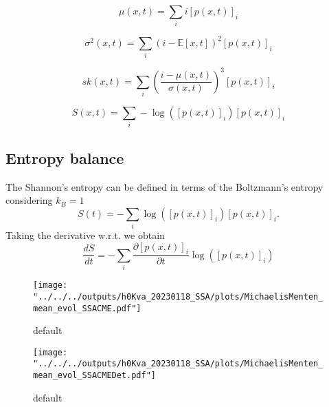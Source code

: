 \documentclass[conference]{IEEEtran}
\begin{document}
\begin{equation}
\mu(x,t) = \sum_i i [p(x,t)]_i
\end{equation}

\begin{equation}
\sigma^2(x,t) = \sum_i (i - \mathbb{E}[x,t])^2 [p(x,t)]_i
\end{equation}

\begin{equation}
sk(x,t) = \sum_i \left(\frac{i - \mu(x,t)}{\sigma(x,t)}\right)^3 [p(x,t)]_i
\end{equation}

\begin{equation}
S(x,t) = \sum_i -\log([p(x,t)]_i) [p(x,t)]_i
\end{equation}

\subsection{Entropy balance}
The Shannon's entropy can be defined in terms of the Boltzmann's entropy considering $k_B = 1$
%
\begin{equation}
S(t) = - \sum_i \log([p(x,t)]_i)[p(x,t)]_i.
\end{equation}
%
Taking the derivative w.r.t. we obtain
%
\begin{equation}
\frac{dS}{dt} = - \sum_i \frac{\partial [p(x,t)]_i}{\partial t} \log([p(x,t)]_i)
\end{equation}


\begin{figure}[htbp]
\begin{center}
\texttt{[image: "../../../outputs/h0Kva\_20230118\_SSA/plots/MichaelisMenten\_mean\_evol\_SSACME.pdf"]}
\caption{default}
\label{default}
\end{center}
\end{figure}
\begin{figure}[htbp]
\begin{center}
\texttt{[image: "../../../outputs/h0Kva\_20230118\_SSA/plots/MichaelisMenten\_mean\_evol\_SSACMEDet.pdf"]}
\caption{default}
\label{default}
\end{center}
\end{figure}
\end{document}

